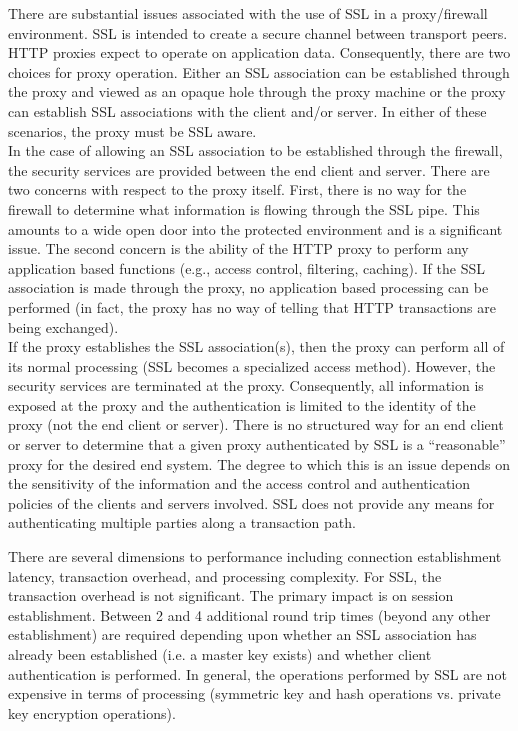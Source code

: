   There are substantial issues associated with the use of SSL in a
  proxy/firewall environment. SSL is intended to create a secure channel
  between transport peers. HTTP proxies expect to operate on application
  data. Consequently, there are two choices for proxy operation. Either an
  SSL association can be established through the proxy and viewed as an
  opaque hole through the proxy machine or the proxy can establish SSL
  associations with the client and/or server. In either of these scenarios,
  the proxy must be SSL aware.\\

  In the case of allowing an SSL association to be established through the
  firewall, the security services are provided between the end client and
  server. There are two concerns with respect to the proxy itself.  First,
  there is no way for the firewall to determine what information is flowing
  through the SSL pipe. This amounts to a wide open door into the protected
  environment and is a significant issue. The second concern is the ability
  of the HTTP proxy to perform any application based functions (e.g.,
  access control, filtering, caching). If the SSL association is made
  through the proxy, no application based processing can be performed (in
  fact, the proxy has no way of telling that HTTP transactions are being
  exchanged).\\
  
  If the proxy establishes the SSL association(s), then the proxy can
  perform all of its normal processing (SSL becomes a specialized access
  method). However, the security services are terminated at the proxy.
  Consequently, all information is exposed at the proxy and the
  authentication is limited to the identity of the proxy (not the end
  client or server). There is no structured way for an end client or server
  to determine that a given proxy authenticated by SSL is a ``reasonable''
  proxy for the desired end system. The degree to which this is an issue
  depends on the sensitivity of the information and the access control and
  authentication policies of the clients and servers involved. SSL does not
  provide any means for authenticating multiple parties along a transaction
  path.

  
  There are several dimensions to performance including connection
  establishment latency, transaction overhead, and processing complexity.
  For SSL, the transaction overhead is not significant. The primary impact
  is on session establishment. Between 2 and 4 additional round trip times
  (beyond any other establishment) are required depending upon whether an
  SSL association has already been established (i.e. a master key exists)
  and whether client authentication is performed. In general, the
  operations performed by SSL are not expensive in terms of processing
  (symmetric key and hash operations vs. private key encryption
  operations).\\
  

